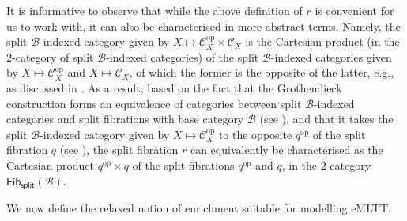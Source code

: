 It is informative to observe that while the above definition of $r$ is convenient for us to work with, it can also be characterised in more abstract terms. Namely, the split $\mathcal{B}$-indexed category given by $X \mapsto \mathcal{C}^{\text{op}}_X \times \mathcal{C}_X$ is the Cartesian product (in the $2$-category of split $\mathcal{B}$-indexed categories) of the split $\mathcal{B}$-indexed categories given by $X \mapsto \mathcal{C}^{\text{op}}_X$ and $X \mapsto \mathcal{C}_X$, of which the former is the opposite  of the latter, e.g., as discussed in \cite[Definition~1.10.10]{Jacobs:Book}. As a result, based on the fact that the Grothendieck construction forms an equivalence of categories between split $\mathcal{B}$-indexed categories and split fibrations with base category $\mathcal{B}$ (see \cite[Proposition~1.10.9]{Jacobs:Book}), and that it takes the split $\mathcal{B}$-indexed category given by $X \mapsto \mathcal{C}^{\text{op}}_X$ to the opposite $q^{\text{op}}$ of the split fibration $q$ (see \cite[Exercise~1.10.9]{Jacobs:Book}), the split fibration $r$ can equivalently be characterised as the Cartesian product $q^{\text{op}} \times q$ of the split fibrations $q^{\text{op}}$ and $q$, in the $2$-category $\mathsf{Fib}_{\mathsf{split}}(\mathcal{B})$.


We now define the relaxed notion of enrichment suitable for modelling eMLTT.


